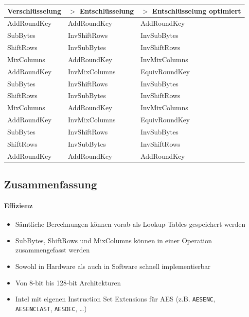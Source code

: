 \begin{center}
    \begin{tabular}{ lll } 
        \hline
        Verschlüsselung & $>$ Entschlüsselung & $>$ Entschlüsselung optimiert\\ 
        \hline
        AddRoundKey & AddRoundKey   & AddRoundKey \\
        SubBytes    & InvShiftRows  & InvSubBytes \\
        ShiftRows   & InvSubBytes   & InvShiftRows \\ 
        MixColumns  & AddRoundKey   & InvMixColumns \\
        AddRoundKey & InvMixColumns & EquivRoundKey \\
        SubBytes    & InvShiftRows  & InvSubBytes \\
        ShiftRows   & InvSubBytes   & InvShiftRows \\
        MixColumns  & AddRoundKey   & InvMixColumns \\
        AddRoundKey & InvMixColumns & EquivRoundKey \\
        SubBytes    & InvShiftRows  & InvSubBytes \\
        ShiftRows   & InvSubBytes   & InvShiftRows \\
        AddRoundKey & AddRoundKey   & AddRoundKey \\
        \hline
    \end{tabular}
\end{center}

\subsection{Zusammenfassung}

\paragraph{Effizienz}

\begin{itemize}
    \item Sämtliche Berechnungen können vorab als Lookup-Tables gespeichert werden
    \item SubBytes, ShiftRows und MixColumns können in einer Operation zusammengefasst werden
    \item Sowohl in Hardware als auch in Software schnell implementierbar
    \item Von 8-bit bis 128-bit Architekturen
    \item Intel mit eigenen Instruction Set Extensions für AES (z.B. \verb|AESENC|, \verb|AESENCLAST|, \verb|AESDEC|, \ldots)
\end{itemize}

